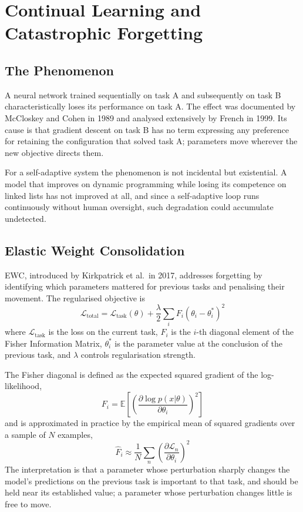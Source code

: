 \documentclass[12pt,a4paper]{report}
\begin{document}
\section{Continual Learning and Catastrophic Forgetting}

\subsection{The Phenomenon}

A neural network trained sequentially on task A and subsequently on task B characteristically loses its performance on task A. The effect was documented by McCloskey and Cohen in 1989 and analysed extensively by French in 1999. Its cause is that gradient descent on task B has no term expressing any preference for retaining the configuration that solved task A; parameters move wherever the new objective directs them.

For a self-adaptive system the phenomenon is not incidental but existential. A model that improves on dynamic programming while losing its competence on linked lists has not improved at all, and since a self-adaptive loop runs continuously without human oversight, such degradation could accumulate undetected.

\subsection{Elastic Weight Consolidation}

EWC, introduced by Kirkpatrick et al.~in 2017, addresses forgetting by identifying which parameters mattered for previous tasks and penalising their movement. The regularised objective is
\begin{equation}
\mathcal{L}_{\text{total}} = \mathcal{L}_{\text{task}}(\theta) + \frac{\lambda}{2} \sum_i F_i (\theta_i - \theta^*_i)^2
\end{equation}
where $\mathcal{L}_{\text{task}}$ is the loss on the current task, $F_i$ is the $i$-th diagonal element of the Fisher Information Matrix, $\theta^*_i$ is the parameter value at the conclusion of the previous task, and $\lambda$ controls regularisation strength.

The Fisher diagonal is defined as the expected squared gradient of the log-likelihood,
\begin{equation}
F_i = \mathbb{E}\left[\left( \frac{\partial \log p(x|\theta)}{\partial \theta_i} \right)^2\right]
\end{equation}
and is approximated in practice by the empirical mean of squared gradients over a sample of $N$ examples,
\begin{equation}
\hat{F}_i \approx \frac{1}{N} \sum_n \left(\frac{\partial \mathcal{L}_n}{\partial \theta_i}\right)^2
\end{equation}
The interpretation is that a parameter whose perturbation sharply changes the model's predictions on the previous task is important to that task, and should be held near its established value; a parameter whose perturbation changes little is free to move.
\end{document}
